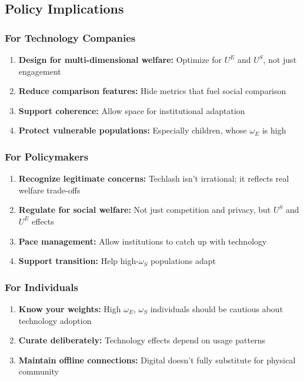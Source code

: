 \subsection{Policy Implications}

\subsubsection{For Technology Companies}

\begin{enumerate}
    \item \textbf{Design for multi-dimensional welfare:} Optimize for $U^E$ and $U^S$, 
    not just engagement
    \item \textbf{Reduce comparison features:} Hide metrics that fuel social comparison
    \item \textbf{Support coherence:} Allow space for institutional adaptation
    \item \textbf{Protect vulnerable populations:} Especially children, whose $\omega_E$ is high
\end{enumerate}

\subsubsection{For Policymakers}

\begin{enumerate}
    \item \textbf{Recognize legitimate concerns:} Techlash isn't irrational; it reflects 
    real welfare trade-offs
    \item \textbf{Regulate for social welfare:} Not just competition and privacy, but 
    $U^S$ and $U^E$ effects
    \item \textbf{Pace management:} Allow institutions to catch up with technology
    \item \textbf{Support transition:} Help high-$\omega_S$ populations adapt
\end{enumerate}

\subsubsection{For Individuals}

\begin{enumerate}
    \item \textbf{Know your weights:} High $\omega_E$, $\omega_S$ individuals should 
    be cautious about technology adoption
    \item \textbf{Curate deliberately:} Technology effects depend on usage patterns
    \item \textbf{Maintain offline connections:} Digital doesn't fully substitute for physical community
\end{enumerate}

